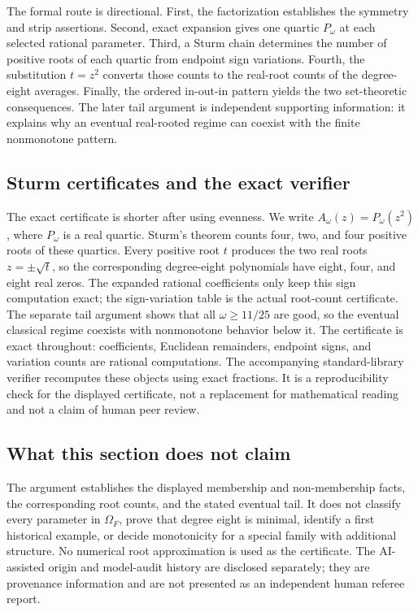 \documentclass[11pt]{article}
\newcommand{\OmegaF}{\Omega_F}
\begin{document}
The formal route is directional. First, the factorization establishes the
symmetry and strip assertions. Second, exact expansion gives one quartic
$P_\omega$ at each selected rational parameter. Third, a Sturm chain
determines the number of positive roots of each quartic from endpoint sign
variations. Fourth, the substitution $t=z^2$ converts those counts to the
real-root counts of the degree-eight averages. Finally, the ordered in-out-in
pattern yields the two set-theoretic consequences. The later tail argument is
independent supporting information: it explains why an eventual real-rooted
regime can coexist with the finite nonmonotone pattern.

\subsection*{Sturm certificates and the exact verifier}

The exact certificate is shorter after using evenness. We write
$A_\omega(z)=P_\omega(z^2)$, where $P_\omega$ is a real quartic. Sturm's
theorem counts four, two, and four positive roots of these quartics. Every
positive root $t$ produces the two real roots $z=\mathbin{\pm}\sqrt t$, so
the corresponding degree-eight polynomials have eight, four, and eight real
zeros. The expanded rational coefficients only keep this sign computation
exact; the sign-variation table is the actual root-count certificate. The
separate tail argument shows that all $\omega\geq11/25$ are good, so the
eventual classical regime coexists with nonmonotone behavior below it. The
certificate is exact throughout: coefficients, Euclidean remainders, endpoint
signs, and variation counts are rational computations. The accompanying
standard-library verifier recomputes these objects using exact fractions. It
is a reproducibility check for the displayed certificate, not a replacement
for mathematical reading and not a claim of human peer review.

\subsection*{What this section does not claim}

The argument establishes the displayed membership and non-membership facts,
the corresponding root counts, and the stated eventual tail. It does not
classify every parameter in $\OmegaF$, prove that degree eight is minimal,
identify a first historical example, or decide monotonicity for a special
family with additional structure. No numerical root approximation is used as
the certificate. The AI-assisted origin and model-audit history are disclosed
separately; they are provenance information and are not presented as an
independent human referee report.
\end{document}
